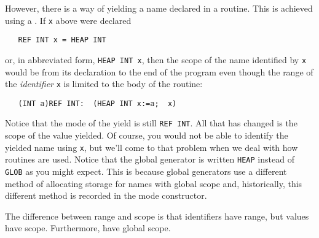However, there is a way of yielding a name declared in a routine.
This is achieved using a . If
\verb|x| above were declared 
\begin{verbatim}
   REF INT x = HEAP INT
\end{verbatim}
\noindent
or, in abbreviated form, \verb|HEAP INT x|, then the scope of the name
identified by \verb|x| would be from its declaration to the end of the
program even though the range of the \emph{identifier} \verb|x| is
limited to the body of the routine:
\begin{verbatim}
   (INT a)REF INT:  (HEAP INT x:=a;  x)
\end{verbatim}
\noindent
Notice that the mode of the yield is still \verb|REF INT|. All that
has changed is the scope of the value yielded. Of course, you would
not be able to identify the yielded name using \verb|x|, but we'll
come to that problem when we deal with how routines are used. Notice
that the global generator is written \verb|HEAP| instead of
\verb|GLOB| as you might expect. This is because global generators
use a different method of allocating storage for names with global
scope and, historically, this different method is recorded in the
mode constructor.

The difference between range and scope is that identifiers have
range, but values have scope. Furthermore,
 have global scope.

